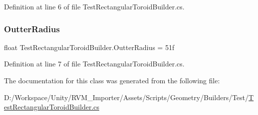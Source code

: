 Definition at line 6 of file Test\+Rectangular\+Toroid\+Builder.\+cs.

\mbox{\label{class_test_rectangular_toroid_builder_aa8f9f63846378fa0a6b6e420e2391e88}} 
\subsubsection{\texorpdfstring{OutterRadius}{OutterRadius}}
{\footnotesize\ttfamily float Test\+Rectangular\+Toroid\+Builder.\+Outter\+Radius = 51f}



Definition at line 7 of file Test\+Rectangular\+Toroid\+Builder.\+cs.



The documentation for this class was generated from the following file\+:\begin{DoxyCompactItemize}
\item 
D\+:/\+Workspace/\+Unity/\+R\+V\+M\+\_\+\+Importer/\+Assets/\+Scripts/\+Geometry/\+Builders/\+Test/\mbox{\hyperlink{_test_rectangular_toroid_builder_8cs}{Test\+Rectangular\+Toroid\+Builder.\+cs}}\end{DoxyCompactItemize}
